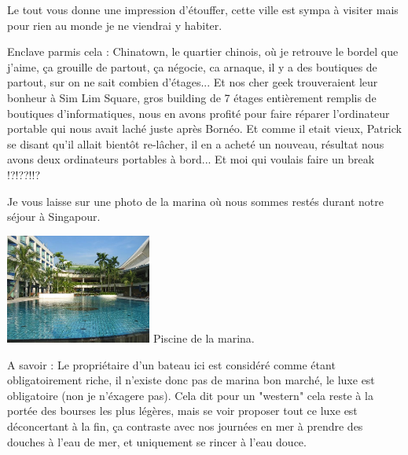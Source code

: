 \begin{multicols}{2}
Le tout vous donne une impression d'étouffer, cette ville est sympa à visiter mais pour rien au monde je ne viendrai y habiter.

Enclave parmis cela : Chinatown, le quartier chinois, où je retrouve le bordel que j'aime, ça grouille de partout, ça négocie, ca arnaque, il y a des boutiques de partout, sur on ne sait combien d'étages... Et nos cher geek trouveraient leur bonheur à Sim Lim Square, gros building de 7 étages entièrement remplis de boutiques d'informatiques, nous en avons profité pour faire réparer l'ordinateur portable qui nous avait laché juste après Bornéo. Et comme il etait vieux, Patrick se disant qu'il allait bientôt re-lâcher, il en a acheté un nouveau, résultat nous avons deux ordinateurs portables à bord... Et moi qui voulais faire un break !?!??!!?

Je vous laisse sur une photo de la marina où nous sommes restés durant notre séjour à Singapour.

\hspace*{-0.65cm}
\includegraphics[width=4.8cm]{articles/Singapour-ville-pays/1210345462qOEk.jpg}
Piscine de la marina.

A savoir : Le propriétaire d'un bateau ici est considéré comme étant obligatoirement riche, il n'existe donc pas de marina bon marché, le luxe est obligatoire (non je n'éxagere pas). Cela dit pour un "western" cela reste à la portée des bourses les plus légères, mais se voir proposer tout ce luxe est déconcertant à la fin, ça contraste avec nos journées en mer à prendre des douches à l'eau de mer, et uniquement se rincer à l'eau douce.

\end{multicols}


